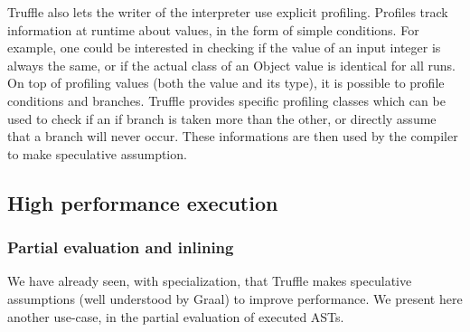 \documentclass[twoside,11pt,a4paper]{article}
\newcommand{\java}[1]{\textsf{#1}}
\begin{document}


Truffle also lets the writer of the interpreter use explicit profiling. Profiles track information at runtime about values, in the form of simple conditions. For example, one could be interested in checking if the value of an input integer is always the same, or if the actual class of an \java{Object} value is identical for all runs. On top of profiling values (both the value and its type), it is possible to profile conditions and branches. Truffle provides specific profiling classes which can be used to check if an \java{if} branch is taken more than the other, or directly assume that a branch will never occur. These informations are then used by the compiler to make speculative assumption.

\subsection{High performance execution}

\subsubsection{Partial evaluation and inlining}
\label{sec:partialevaluation}

We have already seen, with specialization, that Truffle makes speculative assumptions (well understood by Graal) to improve performance. We present here another use-case, in the partial evaluation of executed ASTs.
\end{document}
